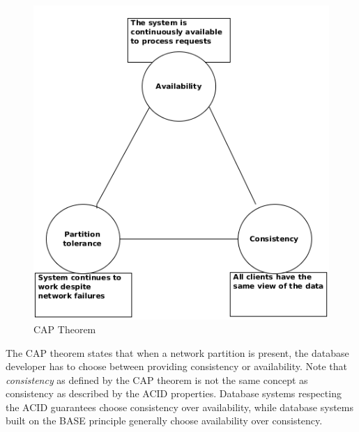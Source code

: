 \begin{figure}
  \centering
  \includegraphics[width=.6\textwidth]{img/cap-theorem.png}
  \caption{CAP Theorem}
  \label{fig:cap-theorem}
\end{figure}

The CAP theorem states that when a network partition is present, the database developer has to choose between providing consistency or availability.
Note that \textit{consistency} as defined by the CAP theorem is not the same concept as consistency as described by the ACID properties.
Database systems respecting the ACID guarantees choose consistency over availability, while database systems built on the BASE principle generally choose availability over consistency.
